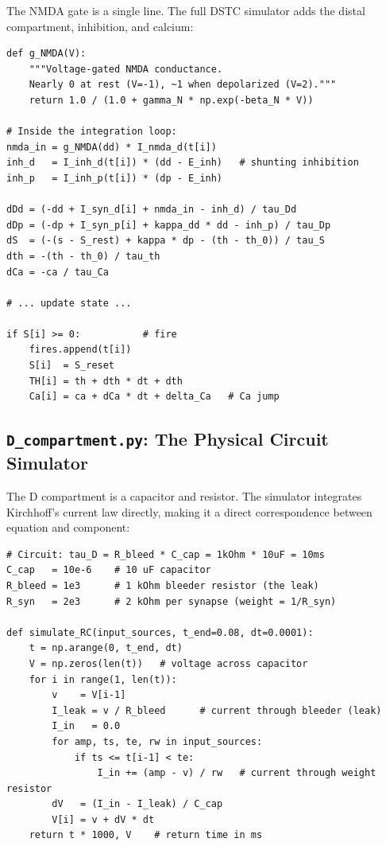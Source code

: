 \documentclass[12pt]{article}
\begin{document}
The NMDA gate is a single line. The full DSTC simulator adds the distal compartment, inhibition, and calcium:

\begin{lstlisting}[caption={NMDA gate and DSTC step (\texttt{dstc\_model.py})}, label={lst:dstc}]
def g_NMDA(V):
    """Voltage-gated NMDA conductance.
    Nearly 0 at rest (V=-1), ~1 when depolarized (V=2)."""
    return 1.0 / (1.0 + gamma_N * np.exp(-beta_N * V))

# Inside the integration loop:
nmda_in = g_NMDA(dd) * I_nmda_d(t[i])
inh_d   = I_inh_d(t[i]) * (dd - E_inh)   # shunting inhibition
inh_p   = I_inh_p(t[i]) * (dp - E_inh)

dDd = (-dd + I_syn_d[i] + nmda_in - inh_d) / tau_Dd
dDp = (-dp + I_syn_p[i] + kappa_dd * dd - inh_p) / tau_Dp
dS  = (-(s - S_rest) + kappa * dp - (th - th_0)) / tau_S
dth = -(th - th_0) / tau_th
dCa = -ca / tau_Ca

# ... update state ...

if S[i] >= 0:           # fire
    fires.append(t[i])
    S[i]  = S_reset
    TH[i] = th + dth * dt + dth
    Ca[i] = ca + dCa * dt + delta_Ca   # Ca jump
\end{lstlisting}

\subsection{\texttt{D\_compartment.py}: The Physical Circuit Simulator}

The D compartment is a capacitor and resistor. The simulator integrates Kirchhoff's current law directly, making it a direct correspondence between equation and component:

\begin{lstlisting}[caption={RC circuit simulator (\texttt{D\_compartment.py})}, label={lst:rc}]
# Circuit: tau_D = R_bleed * C_cap = 1kOhm * 10uF = 10ms
C_cap   = 10e-6    # 10 uF capacitor
R_bleed = 1e3      # 1 kOhm bleeder resistor (the leak)
R_syn   = 2e3      # 2 kOhm per synapse (weight = 1/R_syn)

def simulate_RC(input_sources, t_end=0.08, dt=0.0001):
    t = np.arange(0, t_end, dt)
    V = np.zeros(len(t))   # voltage across capacitor
    for i in range(1, len(t)):
        v    = V[i-1]
        I_leak = v / R_bleed      # current through bleeder (leak)
        I_in   = 0.0
        for amp, ts, te, rw in input_sources:
            if ts <= t[i-1] < te:
                I_in += (amp - v) / rw   # current through weight resistor
        dV   = (I_in - I_leak) / C_cap
        V[i] = v + dV * dt
    return t * 1000, V    # return time in ms
\end{lstlisting}
\end{document}
